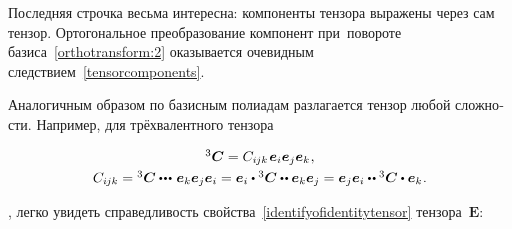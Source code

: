 \begin{otherlanguage}{russian}
Последняя строчка весьма интересна: компоненты тензора выражены через сам тензор. Ортогональное преобразование компонент при~повороте базиса~\eqref{orthotransform:2} оказывается очевидным следствием~\eqref{tensorcomponents}.

Аналогичным образом по базисным полиадам разлагается тензор любой сложности. Например, для трёхвалентного тензора

\nopagebreak\begin{equation}\label{polyada:3}
\begin{array}{c}
{^3\!\,\bm{C}} = C_{i\hspace{-0.1ex}jk} \hspace{.2ex} \bm{e}_i \bm{e}_j \bm{e}_k \hspace{.1ex},
\\[.8ex]
C_{i\hspace{-0.1ex}jk} = {^3\!\,\bm{C}} \dotdotdotp \bm{e}_k \bm{e}_j \bm{e}_i = \bm{e}_i \dotp {^3\!\,\bm{C}} \dotdotp \bm{e}_k \bm{e}_j = \bm{e}_j \bm{e}_i \dotdotp {^3\!\,\bm{C}} \dotp \bm{e}_k \hspace{.1ex}.
\end{array}
\end{equation}

 , легко увидеть справедливость свойства~\eqref{identifyofidentitytensor}  тензора~$\bm{E}$:


\end{otherlanguage}
